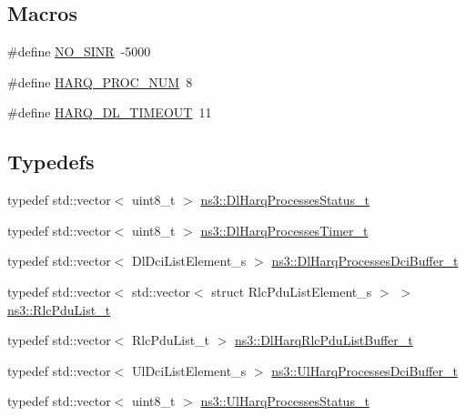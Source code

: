 \subsection*{Macros}
\begin{DoxyCompactItemize}
\item 
\#define \hyperlink{cqa-ff-mac-scheduler_8h_a520d71777be043568160c783a9c65fd5}{N\+O\+\_\+\+S\+I\+NR}~-\/5000
\item 
\#define \hyperlink{cqa-ff-mac-scheduler_8h_a9185d8d7d2b2979181d4a7044a3d3555}{H\+A\+R\+Q\+\_\+\+P\+R\+O\+C\+\_\+\+N\+UM}~8
\item 
\#define \hyperlink{cqa-ff-mac-scheduler_8h_add9e0c4889dc1b5b25686480b31ad166}{H\+A\+R\+Q\+\_\+\+D\+L\+\_\+\+T\+I\+M\+E\+O\+UT}~11
\end{DoxyCompactItemize}
\subsection*{Typedefs}
\begin{DoxyCompactItemize}
\item 
typedef std\+::vector$<$ uint8\+\_\+t $>$ \hyperlink{namespacens3_a457b3571b67ff17d042e9894e90e2ce2}{ns3\+::\+Dl\+Harq\+Processes\+Status\+\_\+t}
\item 
typedef std\+::vector$<$ uint8\+\_\+t $>$ \hyperlink{namespacens3_a39413ade536de4b1c82d6c0074cc703e}{ns3\+::\+Dl\+Harq\+Processes\+Timer\+\_\+t}
\item 
typedef std\+::vector$<$ Dl\+Dci\+List\+Element\+\_\+s $>$ \hyperlink{namespacens3_af25599bf8f9f564075c005759c9af18c}{ns3\+::\+Dl\+Harq\+Processes\+Dci\+Buffer\+\_\+t}
\item 
typedef std\+::vector$<$ std\+::vector$<$ struct Rlc\+Pdu\+List\+Element\+\_\+s $>$ $>$ \hyperlink{namespacens3_a8bbbadfe5a3a754bab3d0822b6bbc1f6}{ns3\+::\+Rlc\+Pdu\+List\+\_\+t}
\item 
typedef std\+::vector$<$ Rlc\+Pdu\+List\+\_\+t $>$ \hyperlink{namespacens3_a4c0cbd1e72f1c667f8b5879655f13210}{ns3\+::\+Dl\+Harq\+Rlc\+Pdu\+List\+Buffer\+\_\+t}
\item 
typedef std\+::vector$<$ Ul\+Dci\+List\+Element\+\_\+s $>$ \hyperlink{namespacens3_a042cbd6bf67e73911cba35b8c070223d}{ns3\+::\+Ul\+Harq\+Processes\+Dci\+Buffer\+\_\+t}
\item 
typedef std\+::vector$<$ uint8\+\_\+t $>$ \hyperlink{namespacens3_af765c4daaafe4ea4809c1041fc196629}{ns3\+::\+Ul\+Harq\+Processes\+Status\+\_\+t}
\end{DoxyCompactItemize}


